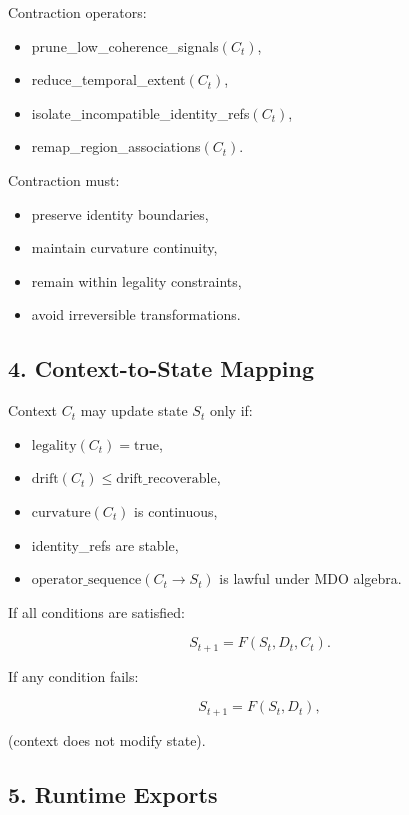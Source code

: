 Contraction operators:
\begin{itemize}[leftmargin=1.2cm]
    \item prune\_low\_coherence\_signals$(C_t)$,
    \item reduce\_temporal\_extent$(C_t)$,
    \item isolate\_incompatible\_identity\_refs$(C_t)$,
    \item remap\_region\_associations$(C_t)$.
\end{itemize}

Contraction must:
\begin{itemize}[leftmargin=1.2cm]
    \item preserve identity boundaries,
    \item maintain curvature continuity,
    \item remain within legality constraints,
    \item avoid irreversible transformations.
\end{itemize}

\subsection*{4. Context-to-State Mapping}
\label{boot:cwg_context_to_state}

Context $C_t$ may update state $S_t$ only if:
\begin{itemize}[leftmargin=1.2cm]
    \item $\text{legality}(C_t) = \text{true}$,
    \item $\text{drift}(C_t) \leq \text{drift\_recoverable}$,
    \item $\text{curvature}(C_t)$ is continuous,
    \item identity\_refs are stable,
    \item $\text{operator\_sequence}(C_t \rightarrow S_t)$ is lawful under MDO algebra.
\end{itemize}

If all conditions are satisfied:



\[
S_{t+1} = F(S_t, D_t, C_t).
\]



If any condition fails:



\[
S_{t+1} = F(S_t, D_t),
\]



(context does not modify state).

\subsection*{5. Runtime Exports}
\label{boot:cwg_exports}

